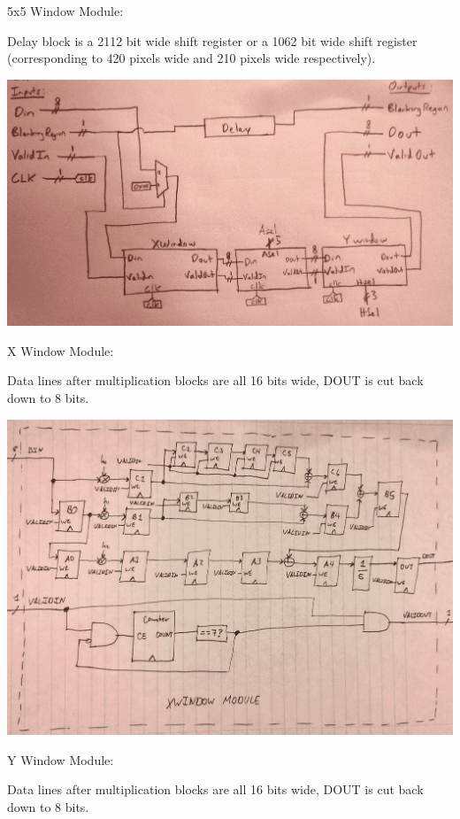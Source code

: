 \documentclass[11pt]{article}
\begin{document}
\newpage

5x5 Window Module:

Delay block is a 2112 bit wide shift register or a 1062 bit wide shift register (corresponding to 420 pixels wide and 210 pixels wide respectively).

\noindent\includegraphics[width=\textwidth]{modules/proc5x5window.png}

\newpage
X Window Module:

Data lines after multiplication blocks are all 16 bits wide, DOUT is cut
back down to 8 bits.

\noindent\includegraphics[width=\textwidth]{modules/procx_window.png}

\newpage 

Y Window Module:

Data lines after multiplication blocks are all 16 bits wide, DOUT is cut
back down to 8 bits.
\end{document}
